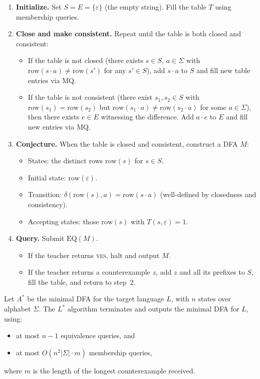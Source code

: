 \begin{enumerate}[leftmargin=*, itemsep=4pt]
\item \textbf{Initialize.} Set $S = E = \{\varepsilon\}$ (the empty string). Fill the table $T$ using membership queries.

\item \textbf{Close and make consistent.} Repeat until the table is both closed and consistent:
\begin{itemize}[nosep]
\item If the table is not closed (there exists $s \in S$, $a \in \Sigma$ with $\mathrm{row}(s \cdot a) \neq \mathrm{row}(s')$ for any $s' \in S$), add $s \cdot a$ to $S$ and fill new table entries via $\mathrm{MQ}$.
\item If the table is not consistent (there exist $s_1, s_2 \in S$ with $\mathrm{row}(s_1) = \mathrm{row}(s_2)$ but $\mathrm{row}(s_1 \cdot a) \neq \mathrm{row}(s_2 \cdot a)$ for some $a \in \Sigma$), then there exists $e \in E$ witnessing the difference. Add $a \cdot e$ to $E$ and fill new entries via $\mathrm{MQ}$.
\end{itemize}

\item \textbf{Conjecture.} When the table is closed and consistent, construct a DFA $M$:
\begin{itemize}[nosep]
\item States: the distinct rows $\mathrm{row}(s)$ for $s \in S$.
\item Initial state: $\mathrm{row}(\varepsilon)$.
\item Transition: $\delta(\mathrm{row}(s), a) = \mathrm{row}(s \cdot a)$ (well-defined by closedness and consistency).
\item Accepting states: those $\mathrm{row}(s)$ with $T(s, \varepsilon) = 1$.
\end{itemize}

\item \textbf{Query.} Submit $\mathrm{EQ}(M)$.
\begin{itemize}[nosep]
\item If the teacher returns \textsc{yes}, halt and output $M$.
\item If the teacher returns a counterexample $z$, add $z$ and all its prefixes to $S$, fill the table, and return to step~2.
\end{itemize}
\end{enumerate}

\begin{thm}
\label{thm:lstar-complexity}
Let $A^*$ be the minimal DFA for the target language $L$, with $n$ states over alphabet $\Sigma$. The $L^*$ algorithm terminates and outputs the minimal DFA for $L$, using:
\begin{itemize}[nosep]
\item at most $n - 1$ equivalence queries, and
\item at most $O(n^2 |\Sigma| \cdot m)$ membership queries,
\end{itemize}
where $m$ is the length of the longest counterexample received.
\end{thm}

